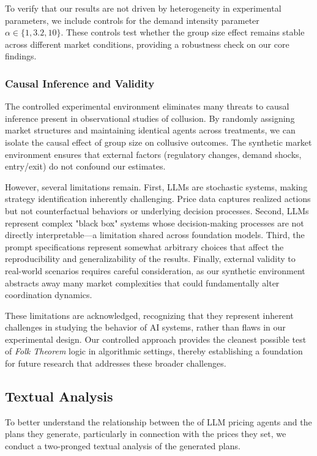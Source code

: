 To verify that our results are not driven by heterogeneity in experimental parameters, we include controls for the demand intensity parameter $\alpha \in \{1, 3.2, 10\}$. These controls test whether the group size effect remains stable across different market conditions, providing a robustness check on our core findings.

\subsubsection*{Causal Inference and Validity}

The controlled experimental environment eliminates many threats to causal inference present in observational studies of collusion. By randomly assigning market structures and maintaining identical agents across treatments, we can isolate the causal effect of group size on collusive outcomes. The synthetic market environment ensures that external factors (regulatory changes, demand shocks, entry/exit) do not confound our estimates.

However, several limitations remain. First, LLMs are stochastic systems, making strategy identification inherently challenging. Price data captures realized actions but not counterfactual behaviors or underlying decision processes. Second, LLMs represent complex "black box" systems whose decision-making processes are not directly interpretable—a limitation shared across foundation models. Third, the prompt specifications represent somewhat arbitrary choices that affect the reproducibility and generalizability of the results. Finally, external validity to real-world scenarios requires careful consideration, as our synthetic environment abstracts away many market complexities that could fundamentally alter coordination dynamics.

These limitations are acknowledged, recognizing that they represent inherent challenges in studying the behavior of AI systems, rather than flaws in our experimental design. Our controlled approach provides the cleanest possible test of \emph{Folk Theorem} logic in algorithmic settings, thereby establishing a foundation for future research that addresses these broader challenges.

\subsection{Textual Analysis}

To better understand the relationship between the  of LLM pricing agents and the plans they generate, particularly in connection with the prices they set, we conduct a two-pronged textual analysis of the generated plans.

